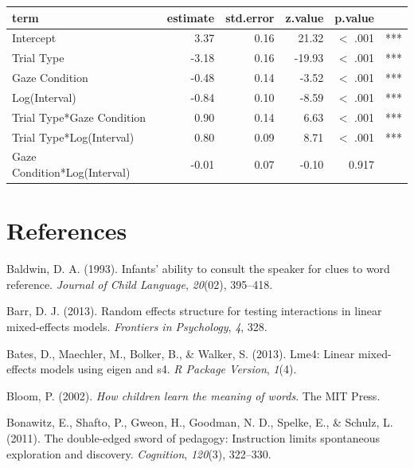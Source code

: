 \documentclass[authoryear, review]{elsarticle}
\begin{document}
\begin{table}[h]
\centering
\begin{tabular}{lrrrrl}
 term & estimate & std.error & z.value & p.value &  \\ 
  \hline
Intercept & 3.37 & 0.16 & 21.32 & $<$ .001 & *** \\ 
  Trial Type & -3.18 & 0.16 & -19.93 & $<$ .001 & *** \\ 
  Gaze Condition & -0.48 & 0.14 & -3.52 & $<$ .001 & *** \\ 
  Log(Interval) & -0.84 & 0.10 & -8.59 & $<$ .001 & *** \\ 
  Trial Type*Gaze Condition & 0.90 & 0.14 & 6.63 & $<$ .001 & *** \\ 
  Trial Type*Log(Interval) & 0.80 & 0.09 & 8.71 & $<$ .001 & *** \\ 
  Gaze Condition*Log(Interval) & -0.01 & 0.07 & -0.10 & 0.917 &  \\ 
   \hline
\end{tabular}
\label{tab:e4_acc}
\end{table}

\newpage

\section{References}\label{references}

\setlength{\parindent}{-0.1in} \setlength{\leftskip}{0.125in} \noindent

\hypertarget{refs}{}
\hypertarget{ref-baldwin1993infants}{}
Baldwin, D. A. (1993). Infants' ability to consult the speaker for clues
to word reference. \emph{Journal of Child Language}, \emph{20}(02),
395--418.

\hypertarget{ref-barr2013random}{}
Barr, D. J. (2013). Random effects structure for testing interactions in
linear mixed-effects models. \emph{Frontiers in Psychology}, \emph{4},
328.

\hypertarget{ref-bates2013lme4}{}
Bates, D., Maechler, M., Bolker, B., \& Walker, S. (2013). Lme4: Linear
mixed-effects models using eigen and s4. \emph{R Package Version},
\emph{1}(4).

\hypertarget{ref-bloom2002children}{}
Bloom, P. (2002). \emph{How children learn the meaning of words}. The
MIT Press.

\hypertarget{ref-bonawitz2011double}{}
Bonawitz, E., Shafto, P., Gweon, H., Goodman, N. D., Spelke, E., \&
Schulz, L. (2011). The double-edged sword of pedagogy: Instruction
limits spontaneous exploration and discovery. \emph{Cognition},
\emph{120}(3), 322--330.
\end{document}
